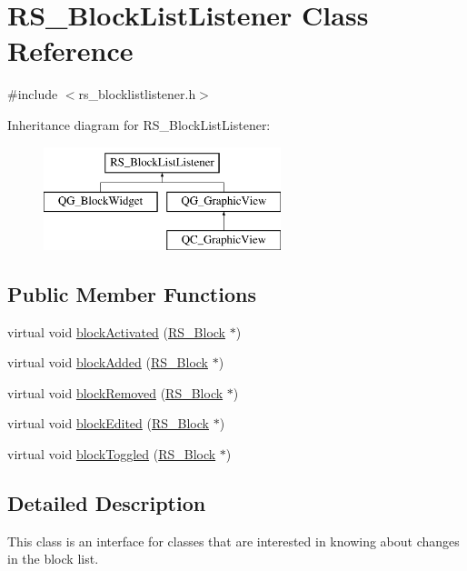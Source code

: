 \hypertarget{classRS__BlockListListener}{\section{R\-S\-\_\-\-Block\-List\-Listener Class Reference}
\label{classRS__BlockListListener}
}


{\ttfamily \#include $<$rs\-\_\-blocklistlistener.\-h$>$}

Inheritance diagram for R\-S\-\_\-\-Block\-List\-Listener\-:\begin{figure}[H]
\begin{center}
\leavevmode
\includegraphics[height=3.000000cm]{classRS__BlockListListener}
\end{center}
\end{figure}
\subsection*{Public Member Functions}
\begin{DoxyCompactItemize}
\item 
virtual void \hyperlink{classRS__BlockListListener_a836501f8d1c0b726c145ece168c2e2c2}{block\-Activated} (\hyperlink{classRS__Block}{R\-S\-\_\-\-Block} $\ast$)
\item 
virtual void \hyperlink{classRS__BlockListListener_a6424d65934abba9b4737413e1c35a922}{block\-Added} (\hyperlink{classRS__Block}{R\-S\-\_\-\-Block} $\ast$)
\item 
virtual void \hyperlink{classRS__BlockListListener_a80547616e22f383d40909b72352f01f0}{block\-Removed} (\hyperlink{classRS__Block}{R\-S\-\_\-\-Block} $\ast$)
\item 
virtual void \hyperlink{classRS__BlockListListener_a6025cde7a4f5f6f98f4a989d3302fb3a}{block\-Edited} (\hyperlink{classRS__Block}{R\-S\-\_\-\-Block} $\ast$)
\item 
virtual void \hyperlink{classRS__BlockListListener_af30e8177f06cc254049194b4be88a620}{block\-Toggled} (\hyperlink{classRS__Block}{R\-S\-\_\-\-Block} $\ast$)
\end{DoxyCompactItemize}


\subsection{Detailed Description}
This class is an interface for classes that are interested in knowing about changes in the block list. 


